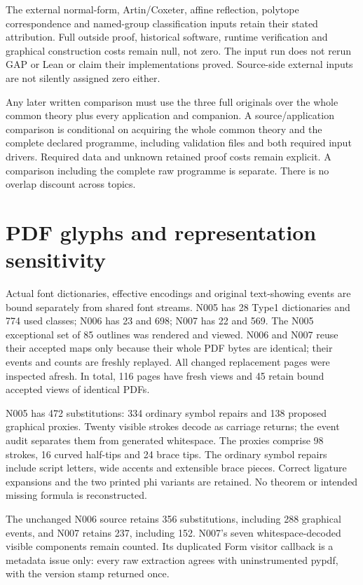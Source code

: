\documentclass[11pt,a4paper]{article}
\begin{document}
The external normal-form, Artin/Coxeter, affine reflection, polytope correspondence and named-group classification inputs retain their stated attribution. Full outside proof, historical software, runtime verification and graphical construction costs remain null, not zero. The input run does not rerun GAP or Lean or claim their implementations proved. Source-side external inputs are not silently assigned zero either.

Any later written comparison must use the three full originals over the whole common theory plus every application and companion. A source/application comparison is conditional on acquiring the whole common theory and the complete declared programme, including validation files and both required input drivers. Required data and unknown retained proof costs remain explicit. A comparison including the complete raw programme is separate. There is no overlap discount across topics.
\newpage
\section*{PDF glyphs and representation sensitivity}
Actual font dictionaries, effective encodings and original text-showing events are bound separately from shared font streams. N005 has 28 Type1 dictionaries and 774 used classes; N006 has 23 and 698; N007 has 22 and 569. The N005 exceptional set of 85 outlines was rendered and viewed. N006 and N007 reuse their accepted maps only because their whole PDF bytes are identical; their events and counts are freshly replayed. All changed replacement pages were inspected afresh. In total, 116 pages have fresh views and 45 retain bound accepted views of identical PDFs.

N005 has 472 substitutions: 334 ordinary symbol repairs and 138 proposed graphical proxies. Twenty visible strokes decode as carriage returns; the event audit separates them from generated whitespace. The proxies comprise 98 strokes, 16 curved half-tips and 24 brace tips. The ordinary symbol repairs include script letters, wide accents and extensible brace pieces. Correct ligature expansions and the two printed phi variants are retained. No theorem or intended missing formula is reconstructed.

The unchanged N006 source retains 356 substitutions, including 288 graphical events, and N007 retains 237, including 152. N007's seven whitespace-decoded visible components remain counted. Its duplicated Form visitor callback is a metadata issue only: every raw extraction agrees with uninstrumented pypdf, with the version stamp returned once.
\end{document}
